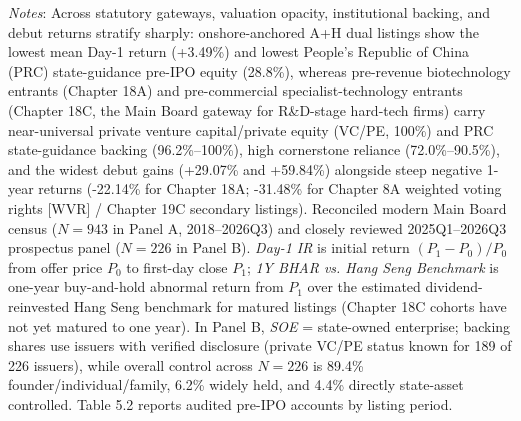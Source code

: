 \documentclass[11pt,letterpaper]{article}
\begin{document}
\begin{table}[!htbp]
\par\vspace{3pt}\noindent\parbox{\textwidth}{\scriptsize\raggedright \textit{Notes}: Across statutory gateways, valuation opacity, institutional backing, and debut returns stratify sharply: onshore-anchored A+H dual listings show the lowest mean Day-1 return (+3.49\%) and lowest People's Republic of China (PRC) state-guidance pre-IPO equity (28.8\%), whereas pre-revenue biotechnology entrants (Chapter 18A) and pre-commercial specialist-technology entrants (Chapter 18C, the Main Board gateway for R\&D-stage hard-tech firms) carry near-universal private venture capital/private equity (VC/PE, 100\%) and PRC state-guidance backing (96.2\%–100\%), high cornerstone reliance (72.0\%–90.5\%), and the widest debut gains (+29.07\% and +59.84\%) alongside steep negative 1-year returns (-22.14\% for Chapter 18A; -31.48\% for Chapter 8A weighted voting rights [WVR] / Chapter 19C secondary listings). Reconciled modern Main Board census ($N = 943$ in Panel A, 2018–2026Q3) and closely reviewed 2025Q1–2026Q3 prospectus panel ($N = 226$ in Panel B). \textit{Day-1 IR} is initial return $(P_1 - P_0)/P_0$ from offer price $P_0$ to first-day close $P_1$; \textit{1Y BHAR vs. Hang Seng Benchmark} is one-year buy-and-hold abnormal return from $P_1$ over the estimated dividend-reinvested Hang Seng benchmark for matured listings (Chapter 18C cohorts have not yet matured to one year). In Panel B, \textit{SOE} = state-owned enterprise; backing shares use issuers with verified disclosure (private VC/PE status known for 189 of 226 issuers), while overall control across $N = 226$ is 89.4\% founder/individual/family, 6.2\% widely held, and 4.4\% directly state-asset controlled. Table 5.2 reports audited pre-IPO accounts by listing period.}
\end{table}
\end{document}

